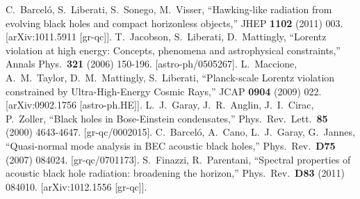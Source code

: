 \documentclass[11pt,a4paper]{article}
\begin{document}
\begin{thebibliography}{666}
  C.~Barcel\'o, S.~Liberati, S.~Sonego, M.~Visser,
  ``Hawking-like radiation from evolving black holes and compact horizonless objects,''
  JHEP {\bf 1102 } (2011)  003.
  [arXiv:1011.5911 [gr-qc]].
  T.~Jacobson, S.~Liberati, D.~Mattingly,
  ``Lorentz violation at high energy: Concepts, phenomena and astrophysical constraints,''
  Annals Phys.\  {\bf 321 } (2006)  150-196.
  [astro-ph/0505267].
  L.~Maccione, A.~M.~Taylor, D.~M.~Mattingly, S.~Liberati,
  ``Planck-scale Lorentz violation constrained by Ultra-High-Energy Cosmic Rays,''
  JCAP {\bf 0904 } (2009)  022.
  [arXiv:0902.1756 [astro-ph.HE]].
  L.~J.~Garay, J.~R.~Anglin, J.~I.~Cirac, P.~Zoller,
  ``Black holes in Bose-Einstein condensates,''
  Phys.\ Rev.\ Lett.\  {\bf 85 } (2000)  4643-4647.
  [gr-qc/0002015].
  C.~Barcel\'o, A.~Cano, L.~J.~Garay, G.~Jannes,
  ``Quasi-normal mode analysis in BEC acoustic black holes,''
  Phys.\ Rev.\  {\bf D75 } (2007)  084024.
  [gr-qc/0701173].
  S.~Finazzi, R.~Parentani,
  ``Spectral properties of acoustic black hole radiation: broadening the horizon,''
  Phys.\ Rev.\  {\bf D83 } (2011)  084010.
  [arXiv:1012.1556 [gr-qc]].





\end{thebibliography}


\end{document}
